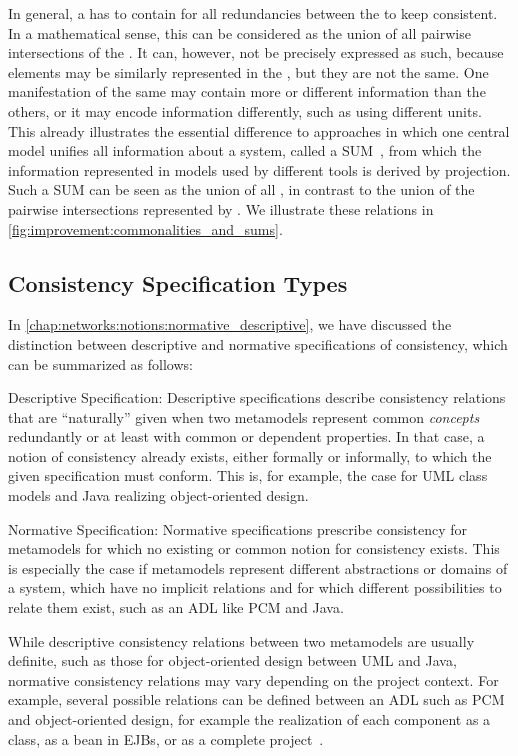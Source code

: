 In general, a \conceptmetamodel has to contain \commonalities for all redundancies between the \concretemetamodels to keep consistent.
In a mathematical sense, this can be considered as the union of all pairwise intersections of the \concretemetamodels.
It can, however, not be precisely expressed as such, because elements may be similarly represented in the \concretemetamodels, but they are not the same.
One manifestation of the same \commonality may contain more or different information than the others, or it may encode information differently, such as using different units.
This already illustrates the essential difference to approaches in which one central model unifies all information about a system, called a \gls{SUM}~\cite{atkinson2010a}, from which the information represented in models used by different tools is derived by projection.
Such a \gls{SUM} can be seen as the union of all \concretemetamodels, in contrast to the union of the pairwise intersections represented by \concretemetamodels.
We illustrate these relations in \autoref{fig:improvement:commonalities_and_sums}.


\subsection{Consistency Specification Types}
\label{chap:improvement:concepts:specification}

In \autoref{chap:networks:notions:normative_descriptive}, we have discussed the distinction between descriptive and normative specifications of consistency, which can be summarized as follows:
\begin{properdescription}
    \item[Descriptive Specification:] Descriptive specifications describe consistency relations that are \enquote{naturally} given when two metamodels represent common \emph{concepts} redundantly or at least with common or dependent properties. 
    In that case, a notion of consistency already exists, either formally or informally, to which the given specification must conform.
    This is, for example, the case for \gls{UML} class models and Java realizing object-oriented design.
    \item[Normative Specification:] Normative specifications prescribe consistency for metamodels for which no existing or common notion for consistency exists.
    This is especially the case if metamodels represent different abstractions or domains of a system, which have no implicit relations and for which different possibilities to relate them exist, such as an \gls{ADL} like \gls{PCM} and Java.
\end{properdescription}
While descriptive consistency relations between two metamodels are usually definite, such as those for object-oriented design between \gls{UML} and Java, normative consistency relations may vary depending on the project context.
For example, several possible relations can be defined between an \gls{ADL} such as \gls{PCM} and object-oriented design, for example the realization of each component as a class, as a bean in \glspl{EJB}, or as a complete project~\cite{langhammer2017a}.

